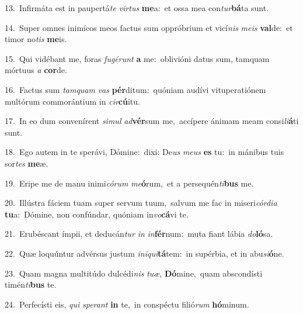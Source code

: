 {\numbfont\textcolor{\numbcolor}{13.}}~Infirmáta est in paupertá\textit{te} \textit{vir}\-\textit{tus} \textbf{me}\-a:~\star et ossa mea con\-\textit{tur}\-\textbf{bá}ta sunt.\par
{\numbfont\textcolor{\numbcolor}{14.}}~Super omnes inimícos meos factus sum oppróbrium et vicí\textit{nis} \textit{me}\-\textit{is} \textbf{val}\-de:~\star et timor no\textit{tis} \textbf{me}\-is.\par
{\numbfont\textcolor{\numbcolor}{15.}}~Qui vidébant me, foras \textit{fu}\-\textit{gé}\textit{runt} \textbf{a} me:~\star oblivióni datus sum, tamquam mórtuus \textit{a} \textbf{cor}\-de.\par
{\numbfont\textcolor{\numbcolor}{16.}}~Factus sum \textit{tam}\-\textit{quam} \textit{vas} \textbf{pér}\-ditum:~\star quóniam audívi vituperatiónem multórum commorántium in \textit{cir}\-\textbf{cú}itu.\par
{\numbfont\textcolor{\numbcolor}{17.}}~In eo dum convenírent \textit{si}\-\textit{mul} \textit{ad}\-\textbf{vér}sum me,~\star accípere ánimam meam consi\-\textit{li}\-\textbf{á}ti sunt.\par
{\numbfont\textcolor{\numbcolor}{18.}}~Ego autem in te sperávi, Dómine:~\dagger dixi: De\textit{us} \textit{me}\-\textit{us} \textbf{es} tu:~\star in mánibus tuis sor\textit{tes} \textbf{me}\-æ.\par
{\numbfont\textcolor{\numbcolor}{19.}}~Eripe me de manu inimi\-\textit{có}\-\textit{rum} \textit{me}\-\textbf{ó}rum,~\star et a persequén\-\textit{ti}\-\textbf{bus} me.\par
{\numbfont\textcolor{\numbcolor}{20.}}~Illústra fáciem tuam super servum tuum,~\dagger salvum me fac in miseri\-\textit{cór}\-\textit{di}\textit{a} \textbf{tu}\-a:~\star Dómine, non confúndar, quóniam in\-\textit{vo}\-\textbf{cá}vi te.\par
{\numbfont\textcolor{\numbcolor}{21.}}~Erubéscant ímpii, et deducán\textit{tur} \textit{in} \textit{in}\-\textbf{fér}num:~\star muta fiant lábia \textit{do}\-\textbf{ló}sa.\par
{\numbfont\textcolor{\numbcolor}{22.}}~Quæ loquúntur advérsus justum \textit{in}\-\textit{i}\textit{qui}\textbf{tá}tem:~\star in supérbia, et in abu\-\textit{si}\-\textbf{ó}ne.\par
{\numbfont\textcolor{\numbcolor}{23.}}~Quam magna multitúdo dulcédi\textit{nis} \textit{tu}\-\textit{æ}, \textbf{Dó}\-mine,~\star quam abscondísti timén\-\textit{ti}\-\textbf{bus} te.\par
{\numbfont\textcolor{\numbcolor}{24.}}~Perfecísti eis, \textit{qui} \textit{spe}\-\textit{rant} \textbf{in} te,~\star in conspéctu filió\textit{rum} \textbf{hó}\-minum.\par
